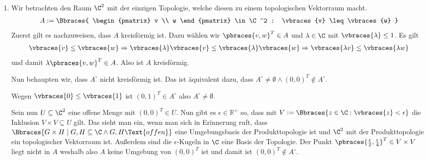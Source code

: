 \begin{solution}
\begin{enumerate}[label = (\roman*)]
  \item Wir betrachten den Raum $\C^2$ mit der einzigen Topologie, welche diesen zu einem topologischen Vektorraum macht.
  \begin{align*}
    A := \Bbraces{
      \begin{pmatrix}
        v \\ w
      \end{pmatrix}
      \in \C^2 : \vbraces{v} \leq \vbraces{w} }
  \end{align*}
  Zuerst gilt es nachzuweisen, dass $A$ kreisförmig ist. Dazu wählen wir $\pbraces{v,w}^T \in A$ und $\lambda \in \C$ mit $\vbraces{\lambda} \leq 1$. Es gilt
  \begin{align*}
    \vbraces{v} \leq \vbraces{w} \Rightarrow \vbraces{\lambda} \vbraces{v} \leq \vbraces{\lambda} \vbraces{w} \Rightarrow \vbraces{\lambda v} \leq \vbraces{\lambda w}
  \end{align*}
  und damit $\lambda \pbraces{v, w}^T \in A$. Also ist $A$ kreisförmig.

  Nun behaupten wir, dass $A^\circ$ nicht kreisförmig ist. Das ist äquivalent dazu, dass $A^\circ \neq \emptyset \land (0,0)^T \notin A^\circ$.

  Wegen $\vbraces{0} \leq \vbraces{1}$ ist $(0,1)^T \in A^\circ$ also $A^\circ \neq \emptyset$.

  Sein nun $U \subseteq \C^2$ eine offene Menge mit $(0,0)^T \in U$. Nun gibt es $\epsilon \in \mathbb{R}^+$ so, dass mit $V:= \Bbraces{z \in \C : \vbraces{z} < \epsilon}$ die Inklusion $V \times V \subseteq U$ gilt. Das sieht man ein, wenn man sich in Erinnerung ruft, dass $\Bbraces{G \times H \mid G,H \subseteq \C \land G,H \Text{ offen}}$ eine Umgebungsbasis der Produkttopologie ist und $\C^2$ mit der Produkttopologie ein topologischer Vektorraum ist. Außerdem sind die $\epsilon$-Kugeln in $\C$ eine Basis der Topologie. Der Punkt $\pbraces{\frac{\epsilon}{2}, \frac{\epsilon}{4} }^T \in V \times V$ liegt nicht in $A$ weshalb also $A$ keine Umgebung von $(0,0)^T$ ist und damit ist $(0,0)^T \notin A^\circ$.

\end{enumerate}

\end{solution}
